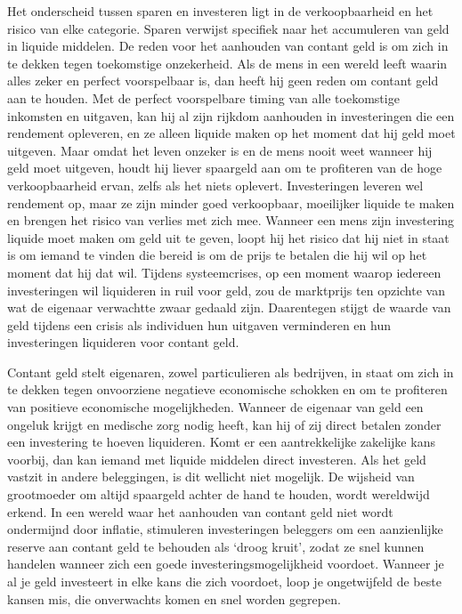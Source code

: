 Het onderscheid tussen sparen en investeren ligt in de verkoopbaarheid en het risico van elke categorie. Sparen verwijst specifiek naar het accumuleren van geld in liquide middelen. De reden voor het aanhouden van contant geld is om zich in te dekken tegen toekomstige onzekerheid. Als de mens in een wereld leeft waarin alles zeker en perfect voorspelbaar is, dan heeft hij geen reden om contant geld aan te houden. Met de perfect voorspelbare timing van alle toekomstige inkomsten en uitgaven, kan hij al zijn rijkdom aanhouden in investeringen die een rendement opleveren, en ze alleen liquide maken op het moment dat hij geld moet uitgeven. Maar omdat het leven onzeker is en de mens nooit weet wanneer hij geld moet uitgeven, houdt hij liever spaargeld aan om te profiteren van de hoge verkoopbaarheid ervan, zelfs als het niets oplevert. Investeringen leveren wel rendement op, maar ze zijn minder goed verkoopbaar, moeilijker liquide te maken en brengen het risico van verlies met zich mee. Wanneer een mens zijn investering liquide moet maken om geld uit te geven, loopt hij het risico dat hij niet in staat is om iemand te vinden die bereid is om de prijs te betalen die hij wil op het moment dat hij dat wil. Tijdens systeemcrises, op een moment waarop iedereen investeringen wil liquideren in ruil voor geld, zou de marktprijs ten opzichte van wat de eigenaar verwachtte zwaar gedaald zijn. Daarentegen stijgt de waarde van geld tijdens een crisis als individuen hun uitgaven verminderen en hun investeringen liquideren voor contant geld.

Contant geld stelt eigenaren, zowel particulieren als bedrijven, in staat om zich in te dekken tegen onvoorziene negatieve economische schokken en om te profiteren van positieve economische mogelijkheden. Wanneer de eigenaar van geld een ongeluk krijgt en medische zorg nodig heeft, kan hij of zij direct betalen zonder een investering te hoeven liquideren. Komt er een aantrekkelijke zakelijke kans voorbij, dan kan iemand met liquide middelen direct investeren. Als het geld vastzit in andere beleggingen, is dit wellicht niet mogelijk. De wijsheid van grootmoeder om altijd spaargeld achter de hand te houden, wordt wereldwijd erkend. In een wereld waar het aanhouden van contant geld niet wordt ondermijnd door inflatie, stimuleren investeringen beleggers om een aanzienlijke reserve aan contant geld te behouden als `droog kruit', zodat ze snel kunnen handelen wanneer zich een goede investeringsmogelijkheid voordoet. Wanneer je al je geld investeert in elke kans die zich voordoet, loop je ongetwijfeld de beste kansen mis, die onverwachts komen en snel worden gegrepen.

